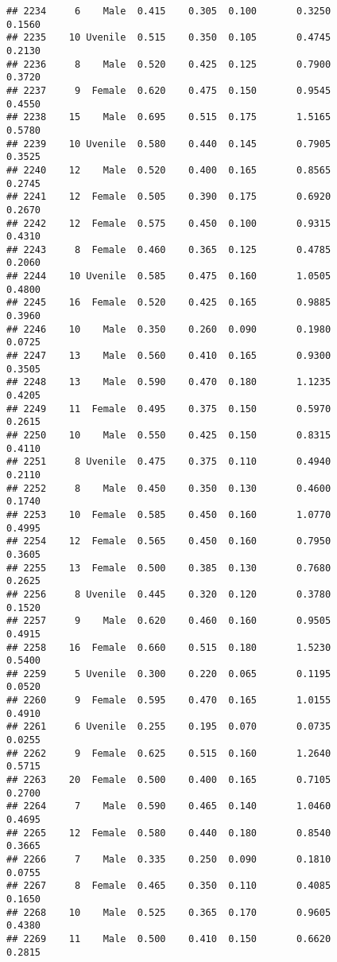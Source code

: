 \documentclass[
]{article}
\begin{document}
\begin{verbatim}
## 2234     6    Male  0.415    0.305  0.100       0.3250         0.1560
## 2235    10 Uvenile  0.515    0.350  0.105       0.4745         0.2130
## 2236     8    Male  0.520    0.425  0.125       0.7900         0.3720
## 2237     9  Female  0.620    0.475  0.150       0.9545         0.4550
## 2238    15    Male  0.695    0.515  0.175       1.5165         0.5780
## 2239    10 Uvenile  0.580    0.440  0.145       0.7905         0.3525
## 2240    12    Male  0.520    0.400  0.165       0.8565         0.2745
## 2241    12  Female  0.505    0.390  0.175       0.6920         0.2670
## 2242    12  Female  0.575    0.450  0.100       0.9315         0.4310
## 2243     8  Female  0.460    0.365  0.125       0.4785         0.2060
## 2244    10 Uvenile  0.585    0.475  0.160       1.0505         0.4800
## 2245    16  Female  0.520    0.425  0.165       0.9885         0.3960
## 2246    10    Male  0.350    0.260  0.090       0.1980         0.0725
## 2247    13    Male  0.560    0.410  0.165       0.9300         0.3505
## 2248    13    Male  0.590    0.470  0.180       1.1235         0.4205
## 2249    11  Female  0.495    0.375  0.150       0.5970         0.2615
## 2250    10    Male  0.550    0.425  0.150       0.8315         0.4110
## 2251     8 Uvenile  0.475    0.375  0.110       0.4940         0.2110
## 2252     8    Male  0.450    0.350  0.130       0.4600         0.1740
## 2253    10  Female  0.585    0.450  0.160       1.0770         0.4995
## 2254    12  Female  0.565    0.450  0.160       0.7950         0.3605
## 2255    13  Female  0.500    0.385  0.130       0.7680         0.2625
## 2256     8 Uvenile  0.445    0.320  0.120       0.3780         0.1520
## 2257     9    Male  0.620    0.460  0.160       0.9505         0.4915
## 2258    16  Female  0.660    0.515  0.180       1.5230         0.5400
## 2259     5 Uvenile  0.300    0.220  0.065       0.1195         0.0520
## 2260     9  Female  0.595    0.470  0.165       1.0155         0.4910
## 2261     6 Uvenile  0.255    0.195  0.070       0.0735         0.0255
## 2262     9  Female  0.625    0.515  0.160       1.2640         0.5715
## 2263    20  Female  0.500    0.400  0.165       0.7105         0.2700
## 2264     7    Male  0.590    0.465  0.140       1.0460         0.4695
## 2265    12  Female  0.580    0.440  0.180       0.8540         0.3665
## 2266     7    Male  0.335    0.250  0.090       0.1810         0.0755
## 2267     8  Female  0.465    0.350  0.110       0.4085         0.1650
## 2268    10    Male  0.525    0.365  0.170       0.9605         0.4380
## 2269    11    Male  0.500    0.410  0.150       0.6620         0.2815

\end{verbatim}
\end{document}
